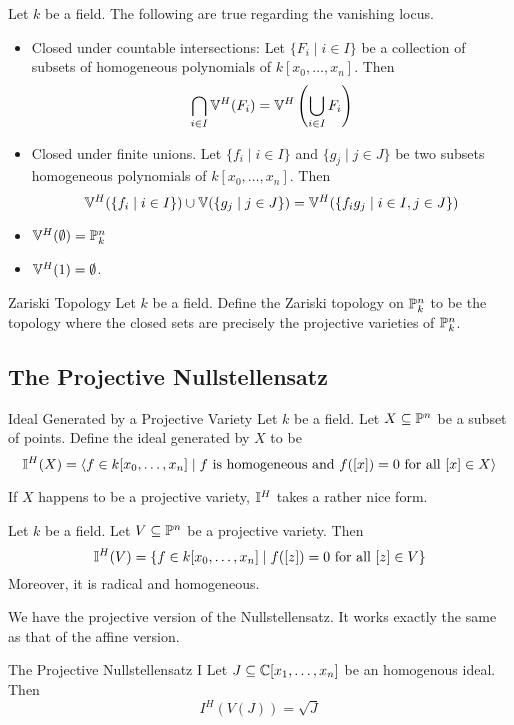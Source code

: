 \documentclass[a4paper]{article}
\begin{document}
\begin{prp}{}{} Let $k$ be a field. The following are true regarding the vanishing locus. 
\begin{itemize}
\item Closed under countable intersections: Let $\{F_i\;|\;i\in I\}$ be a collection of subsets of homogeneous polynomials of $k[x_0,\dots,x_n]$. Then $$\bigcap_{i\in I}\mathbb{V}^H(F_i)=\mathbb{V}^H\left(\bigcup_{i\in I}F_i\right)$$
\item Closed under finite unions. Let $\{f_i\;|\;i\in I\}$ and $\{g_j\;|\;j\in J\}$ be two subsets homogeneous polynomials of $k[x_0,\dots,x_n]$. Then $$\mathbb{V}^H(\{f_i\;|\;i\in I\})\cup\mathbb{V}(\{g_j\;|\;j\in J\})=\mathbb{V}^H(\{f_ig_j\;|\;i\in I, j\in J\})$$
\item $\mathbb{V}^H(\emptyset)=\mathbb{P}_k^n$
\item $\mathbb{V}^H(1)=\emptyset$. 
\end{itemize}
\end{prp}

\begin{defn}{Zariski Topology}{} Let $k$ be a field. Define the Zariski topology on $\mathbb{P}_k^n$ to be the topology where the closed sets are precisely the projective varieties of $\mathbb{P}_k^n$. 
\end{defn}

\subsection{The Projective Nullstellensatz}
\begin{defn}{Ideal Generated by a Projective Variety}{} Let $k$ be a field. Let $X\subseteq\mathbb{P}^n$ be a subset of points. Define the ideal generated by $X$ to be $$\mathbb{I}^H(X)=\langle f\in k[x_0,\dots,x_n]\;|\;f\text{ is homogeneous and }f([x])=0\text{ for all }[x]\in X\rangle$$
\end{defn}

If $X$ happens to be a projective variety, $\mathbb{I}^H$ takes a rather nice form. 

\begin{lmm}{}{} Let $k$ be a field. Let $V\subseteq\mathbb{P}^n$ be a projective variety. Then $$\mathbb{I}^H(V)=\{f\in k[x_0,\dots,x_n]\;|\;f([z])=0\text{ for all }[z]\in V\}$$ Moreover, it is radical and homogeneous. 
\end{lmm}

We have the projective version of the Nullstellensatz. It works exactly the same as that of the affine version. 

\begin{thm}{The Projective Nullstellensatz I}{} Let $J\subseteq\mathbb{C}[x_1,\dots,x_n]$ be an homogenous ideal. Then $$I^H(V(J))=\sqrt{J}$$
\end{thm}
\end{document}
